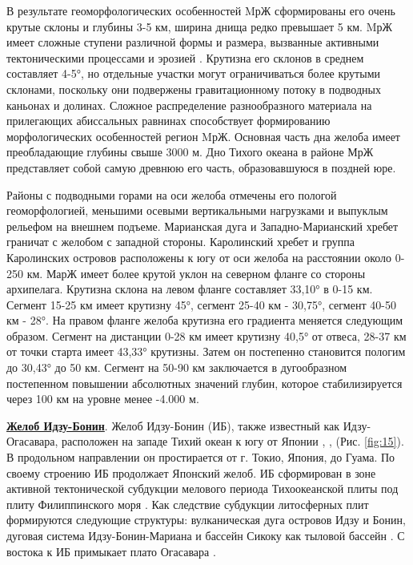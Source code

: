 В результате геоморфологических особенностей MрЖ сформированы его очень крутые склоны и глубины 3-5 км, ширина днища редко превышает 5 км. MрЖ имеет сложные ступени различной формы и размера, вызванные активными тектоническими процессами и эрозией \cite{Ogawaetal1997}. Крутизна его склонов в среднем составляет 4-5°, но отдельные участки могут ограничиваться более крутыми склонами, поскольку они подвержены гравитационному потоку в подводных каньонах и долинах. Сложное распределение разнообразного материала на прилегающих абиссальных равнинах способствует формированию морфологических особенностей регион MрЖ. Основная часть дна желоба имеет преобладающие глубины свыше 3000 м. Дно Тихого океана в районе МрЖ представляет собой самую древнюю его часть, образовавшуюся в поздней юре. 

Районы с подводными горами на оси желоба отмечены его пологой геоморфологией, меньшими осевыми вертикальными нагрузками и выпуклым рельефом на внешнем подъеме. Марианская дуга и Западно-Марианский хребет граничат с желобом с западной стороны. Каролинский хребет и группа Каролинских островов расположены к югу от оси желоба на расстоянии около 0-250 км. МарЖ имеет более крутой уклон на северном фланге со стороны архипелага. Крутизна склона на левом фланге составляет 33,10° в 0-15 км. Сегмент 15-25 км имеет крутизну 45°, сегмент 25-40 км - 30,75°, сегмент 40-50 км - 28°. На правом фланге желоба крутизна его градиента меняется следующим образом. Сегмент на дистанции 0-28 км имеет крутизну 40,5° от отвеса, 28-37 км от точки старта имеет 43,33° крутизны. Затем он постепенно становится пологим до 30,43° до 50 км. Сегмент на 50-90 км заключается в дугообразном постепенном повышении абсолютных значений глубин, которое стабилизируется через 100 км на уровне менее -4.000 м.

\underline{\textbf{Желоб Идзу-Бонин}}. Желоб Идзу-Бонин (ИБ), также известный как Идзу-Огасавара, расположен на западе Тихий океан к югу от Японии \cite{Говоров}, \cite{Ishizukaetal2018}, \cite{Ishizukaetal2010} (Рис. \ref{fig:15}). В продольном направлении он простирается от г. Токио, Япония, до Гуама. По своему строению ИБ продолжает Японский желоб. ИБ сформирован в зоне активной тектонической субдукции мелового периода Тихоокеанской плиты под плиту Филиппинского моря \cite{ZhouLin2018}. Как следствие субдукции литосферных плит формируются следующие структуры: вулканическая дуга островов Идзу и Бонин, дуговая система Идзу-Бонин-Мариана и бассейн Сикоку как тыловой бассейн \cite{Zhouetal2015}. С востока к ИБ примыкает плато Огасавара \cite{Ishizuka2003}.

